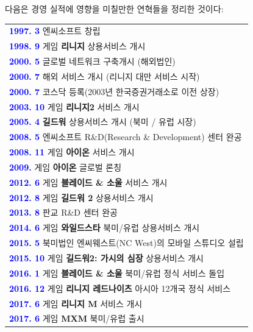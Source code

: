 \documentclass[11pt]{oblivoir}
\newenvironment{textbox}
	{
	\begin{center}
		\begin{tabular}{|p{0.95\textwidth}|}
			\hline
	}
	{
		\\ \hline
		\end{tabular}
		\end{center}
	}
\begin{document}
			다음은 경영 실적에 영향을 미칠만한 연혁들을 정리한 것이다:
			\begin{textbox}
			\textbf{\textcolor{blue}{1997. 3}} 엔씨소프트 창립
			\\
			\textbf{\textcolor{blue}{1998. 9}} 게임  \textbf{리니지} 상용서비스 개시
			\\
			\textbf{\textcolor{blue}{2000. 5}} 글로벌 네트워크 구축개시 (해외법인)
			\\
			\textbf{\textcolor{blue}{2000. 7}} 해외 서비스 개시 (리니지 대만 서비스 시작)
			\\
			\textbf{\textcolor{blue}{2000. 7}} 코스닥 등록(2003년 한국증권거래소로 이전 상장)
			\\
			\textbf{\textcolor{blue}{2003. 10}} 게임 \textbf{리니지2} 서비스 개시
			\\
			\textbf{\textcolor{blue}{2005. 4}} \textbf{길드워} 상용서비스 개시 (북미 / 유럽 시장)
			\\
			\textbf{\textcolor{blue}{2008. 5}} 엔씨소프트 R\&D(Research \& Development) 센터 완공
			\\
			\textbf{\textcolor{blue}{2008. 11}} 게임 \textbf{아이온} 서비스 개시
			\\
			\textbf{\textcolor{blue}{2009.}} 게임 \textbf{아이온} 글로벌 론칭
			\\
			\textbf{\textcolor{blue}{2012. 6}} 게임 \textbf{블레이드 \& 소울} 서비스 개시
			\\
			\textbf{\textcolor{blue}{2012. 8}} 게임 \textbf{길드워 2} 상용서비스 개시
			\\
			\textbf{\textcolor{blue}{2013. 8}} 판교 R\&D 센터 완공
			\\
			\textbf{\textcolor{blue}{2014. 6}} 게임 \textbf{와일드스타} 북미/유럽 상용서비스 개시
			\\
			\textbf{\textcolor{blue}{2015. 5}} 북미법인 엔씨웨스트(NC West)의 모바일 스튜디오 설립
			\\
			\textbf{\textcolor{blue}{2015. 10}} 게임 \textbf{길드워2: 가시의 심장} 상용서비스 개시
			\\
			\textbf{\textcolor{blue}{2016. 1}} 게임 \textbf{블레이드 \& 소울} 북미/유럽 정식 서비스 돌입
			\\
			\textbf{\textcolor{blue}{2016. 12}} 게임 \textbf{리니지 레드나이츠} 아시아 12개국 정식 서비스
			\\
			\textbf{\textcolor{blue}{2017. 6}} 게임 \textbf{리니지 M} 서비스 개시
			\\
			\textbf{\textcolor{blue}{2017. 6}} 게임 \textbf{MXM} 북미/유럽 출시
		\end{textbox}
\end{document}
